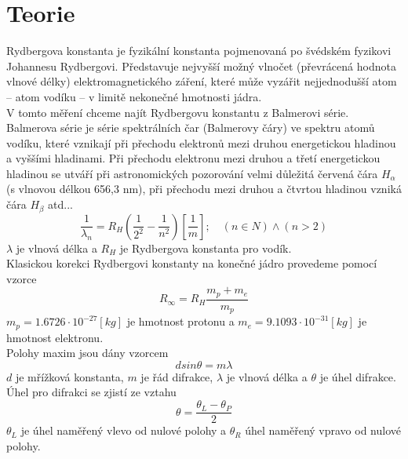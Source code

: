 \documentclass{article}
\begin{document}
\section{Teorie}
Rydbergova konstanta je fyzikální konstanta pojmenovaná po švédském fyzikovi Johannesu Rydbergovi. Představuje nejvyšší možný vlnočet (převrácená hodnota vlnové délky) elektromagnetického záření, které může vyzářit nejjednodušší atom – atom vodíku – v limitě nekonečné hmotnosti jádra.\\
V tomto měření chceme najít Rydbergovu konstantu z Balmerovi série.\\
Balmerova série je série spektrálních čar (Balmerovy čáry) ve spektru atomů vodíku, které vznikají při přechodu elektronů mezi druhou energetickou hladinou a vyššími hladinami. Při přechodu elektronu mezi druhou a třetí energetickou hladinou se utváří při astronomických pozorování velmi důležitá červená čára $H_{\alpha}$ (s vlnovou délkou 656,3 nm), při přechodu mezi druhou a čtvrtou hladinou vzniká čára $H_{\beta}$ atd...
\begin{equation}
  \frac{1}{\lambda_{n}} = R_{H} \left( \frac{1}{2^{2}} - \frac{1}{n^{2}} \right) \left[\frac{1}{m}\right] ; \quad (n \in N) \land (n > 2)
\end{equation}
$\lambda$ je vlnová délka a $R_{H}$ je Rydbergova konstanta pro vodík.\\
Klasickou korekci Rydbergovi konstanty na konečné jádro provedeme pomocí vzorce
\begin{equation}
  R_{\infty} = R_{H} \frac{m_{p} + m_{e}}{m_{p}}
\end{equation}
$m_{p} = 1.6726 \cdot 10^{-27}[kg]$ je hmotnost protonu a $m_{e} = 9.1093 \cdot 10^{-31}[kg]$ je hmotnost elektronu.\\
Polohy maxim jsou dány vzorcem
\begin{equation}
  d sin \theta = m \lambda
\end{equation}
$d$ je mřížková konstanta, $m$ je řád difrakce, $\lambda$ je vlnová délka a $\theta$ je úhel difrakce.
Úhel pro difrakci se zjistí ze vztahu
\begin{equation}
  \theta = \frac{\theta_{L} - \theta_{P}}{2}
\end{equation}
$\theta_{L}$ je úhel naměřený vlevo od nulové polohy a $\theta_{R}$ úhel naměřený vpravo od nulové polohy.
\end{document}
